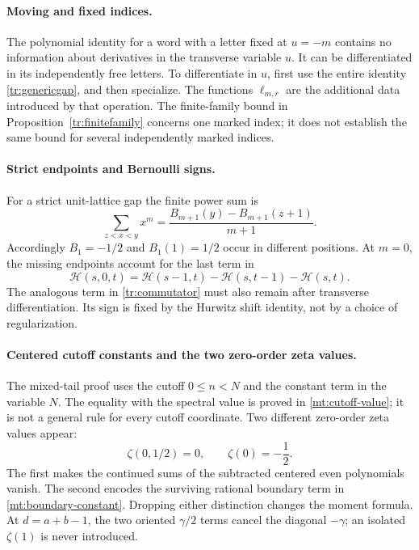 \documentclass[11pt,letterpaper]{article}
\numberwithin{equation}{section}
\theoremstyle{plain}
\theoremstyle{definition}
\theoremstyle{remark}
\newcommand{\HH}{\mathcal H}
\begin{document}
\paragraph{Moving and fixed indices.}
The polynomial identity for a word with a letter fixed at $u=-m$
contains no information about derivatives in the transverse variable
$u$.  It can be differentiated in its independently free letters.
To differentiate in $u$, first use the entire identity
\eqref{tr:genericgap}, and then specialize.  The functions
$\ell_{m,r}$ are the additional data introduced by that operation.
The finite-family bound in Proposition~\ref{tr:finitefamily} concerns
one marked index; it does not establish the same bound for several
independently marked indices.

\paragraph{Strict endpoints and Bernoulli signs.}
For a strict unit-lattice gap the finite power sum is
\[
 \sum_{z<x<y}x^m
   =\frac{B_{m+1}(y)-B_{m+1}(z+1)}{m+1}.
\]
Accordingly $B_1=-1/2$ and $B_1(1)=1/2$ occur in different positions.
At $m=0$, the missing endpoints account for the last term in
\[
 \HH(s,0,t)=\HH(s-1,t)-\HH(s,t-1)-\HH(s,t).
\]
The analogous term in \eqref{tr:commutator} must also remain after
transverse differentiation.  Its sign is fixed by the Hurwitz shift
identity, not by a choice of regularization.

\paragraph{Centered cutoff constants and the two zero-order zeta values.}
The mixed-tail proof uses the cutoff $0\leq n<N$ and the constant
term in the variable $N$.  The equality with the spectral value is
proved in \eqref{mt:cutoff-value}; it is not a general rule for every
cutoff coordinate.  Two different zero-order zeta values appear:
\[
                \zeta(0,1/2)=0,\qquad \zeta(0)=-\frac12.
\]
The first makes the continued sums of the subtracted centered even
polynomials vanish.  The second encodes the surviving rational boundary
term in \eqref{mt:boundary-constant}.  Dropping either distinction
changes the moment formula.  At $d=a+b-1$, the two oriented
$\gamma/2$ terms cancel the diagonal $-\gamma$; an isolated
$\zeta(1)$ is never introduced.
\end{document}

